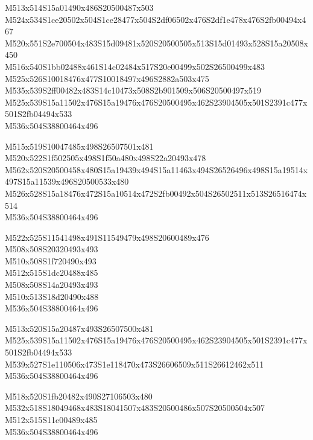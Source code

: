 \documentclass{article}
\begin{document}
\begin{multicols}{5}
\begin{center}
M513x514S15a01490x486S20500487x503 %
\\M524x534S1ce20502x504S1ce28477x504S2df06502x476S2df1e478x476S2fb00494x467 %
\\M520x551S2e700504x483S15d09481x520S20500505x513S15d01493x528S15a20508x450 %
\\M516x540S1bb02488x461S14c02484x517S20e00499x502S26500499x483 %
\\M525x526S10018476x477S10018497x496S2882a503x475 %
\\M535x539S2ff00482x483S14c10473x508S2b901509x506S20500497x519 %
\\M525x539S15a11502x476S15a19476x476S20500495x462S23904505x501S2391c477x501S2fb04494x533 %
\\M536x504S38800464x496 %

M515x519S10047485x498S26507501x481 %
\\M520x522S1f502505x498S1f50a480x498S22a20493x478 %
\\M562x520S20500458x480S15a19439x494S15a11463x494S26526496x498S15a19514x497S15a11539x496S20500533x480 %
\\M526x528S15a18476x472S15a10514x472S2fb00492x504S26502511x513S26516474x514 %
\\M536x504S38800464x496 %

M522x525S11541498x491S11549479x498S20600489x476 %
\\M508x508S20320493x493 %
\\M510x508S1f720490x493 %
\\M512x515S1dc20488x485 %
\\M508x508S14a20493x493 %
\\M510x513S18d20490x488 %
\\M536x504S38800464x496 %

M513x520S15a20487x493S26507500x481 %
\\M525x539S15a11502x476S15a19476x476S20500495x462S23904505x501S2391c477x501S2fb04494x533 %
\\M539x527S1e110506x473S1e118470x473S26606509x511S26612462x511 %
\\M536x504S38800464x496 %

M518x520S1fb20482x490S27106503x480 %
\\M532x518S18049468x483S18041507x483S20500486x507S20500504x507 %
\\M512x515S11e00489x485 %
\\M536x504S38800464x496 %


\end{center}
\end{multicols}
\end{document}
